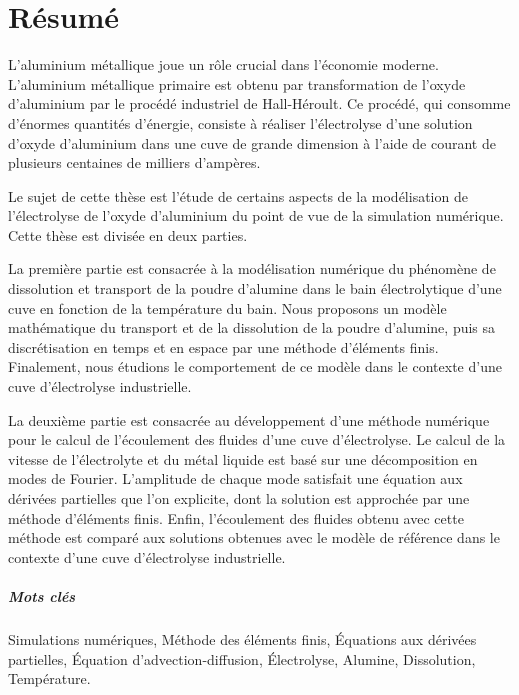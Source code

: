 

\chapter*{Résumé}

L'aluminium métallique joue un rôle crucial dans l'économie
moderne. L'aluminium métallique primaire est obtenu par transformation
de l'oxyde d'aluminium par le procédé industriel de Hall-Héroult. Ce
procédé, qui consomme d'énormes quantités d'énergie, consiste à
réaliser l'électrolyse d'une solution d'oxyde d'aluminium dans une
cuve de grande dimension à l'aide de courant de plusieurs centaines de
milliers d'ampères.

Le sujet de cette thèse est l'étude de certains aspects de la
modélisation de l'électrolyse de l'oxyde d'aluminium du point de vue
de la simulation numérique. Cette thèse est divisée en deux parties.

La première partie est consacrée à la modélisation numérique du
phénomène de dissolution et transport de la poudre d'alumine dans le
bain électrolytique d'une cuve en fonction de la température du
bain. Nous proposons un modèle mathématique du transport et de la
dissolution de la poudre d'alumine, puis sa discrétisation en temps et
en espace par une méthode d'éléments finis. Finalement, nous étudions
le comportement de ce modèle dans le contexte d'une cuve d'électrolyse
industrielle.

La deuxième partie est consacrée au développement d'une méthode
numérique pour le calcul de l'écoulement des fluides d'une cuve
d'électrolyse. Le calcul de la vitesse de l'électrolyte et du métal
liquide est basé sur une décomposition en modes de
Fourier. L'amplitude de chaque mode satisfait une équation aux
dérivées partielles que l'on explicite, dont la solution est approchée
par une méthode d'éléments finis. Enfin, l'écoulement des fluides
obtenu avec cette méthode est comparé aux solutions obtenues avec le
modèle de référence dans le contexte d'une cuve d'électrolyse
industrielle.

\paragraph{Mots clés} Simulations numériques, Méthode des
éléments finis, Équations aux dérivées partielles, Équation
d'advection-diffusion, Électrolyse, Alumine, Dissolution, Température.


